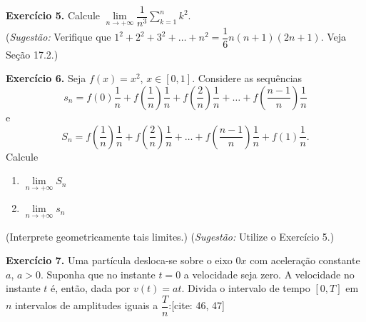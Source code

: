 \documentclass[12pt,a4paper]{article}
\begin{document}
\vspace{0.5cm}
\noindent\textbf{Exercício 5.}
Calcule $\lim\limits_{n \to +\infty} \dfrac{1}{n^3}\sum\limits_{k=1}^n k^2$.\\
(\textit{Sugestão:} Verifique que $1^2 + 2^2 + 3^2 + \dots + n^2 = \dfrac{1}{6}n(n + 1)(2n + 1)$. Veja Seção 17.2.)

\vspace{0.5cm}
\noindent\textbf{Exercício 6.} Seja $f(x) = x^2$, $x \in [0, 1]$. Considere as sequências
\[
s_n = f(0)\dfrac{1}{n} + f\!\left(\dfrac{1}{n}\right)\dfrac{1}{n} + f\!\left(\dfrac{2}{n}\right)\dfrac{1}{n} + \dots + f\!\left(\dfrac{n - 1}{n}\right)\dfrac{1}{n}
\]
e
\[
S_n = f\!\left(\dfrac{1}{n}\right)\dfrac{1}{n} + f\!\left(\dfrac{2}{n}\right)\dfrac{1}{n} + \dots + f\!\left(\dfrac{n - 1}{n}\right)\dfrac{1}{n} + f(1)\dfrac{1}{n}.
\]
Calcule
\begin{enumerate}
    \renewcommand{\theenumi}{\alph{enumi}}
    \renewcommand{\labelenumi}{\theenumi)}
    \item $\lim\limits_{n \to +\infty} S_n$
    \item $\lim\limits_{n \to +\infty} s_n$
\end{enumerate}
(Interprete geometricamente tais limites.) (\textit{Sugestão:} Utilize o Exercício 5.)

\vspace{0.5cm}
\noindent\textbf{Exercício 7.}
Uma partícula desloca-se sobre o eixo $0x$ com aceleração constante $a$, $a > 0$. Suponha que no instante $t = 0$ a velocidade seja zero. A velocidade no instante $t$ é, então, dada por $v(t) = at$. Divida o intervalo de tempo $[0, T]$ em $n$ intervalos de amplitudes iguais a $\dfrac{T}{n}$:[cite: 46, 47]

\begin{center}
\end{center}
\end{document}
